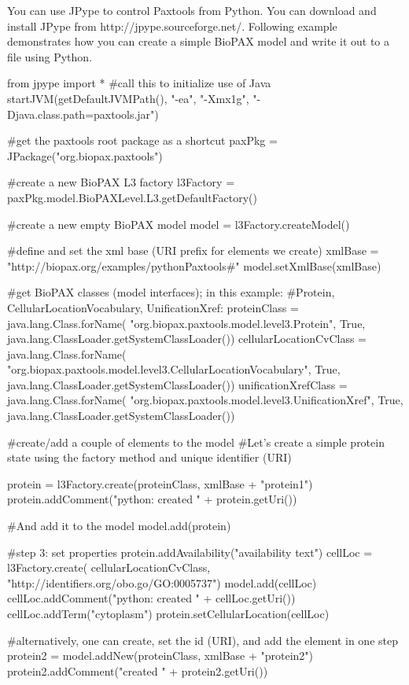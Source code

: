 \documentclass{tufte-book}
\begin{document}
You can use JPype to control Paxtools from Python. You can download and install JPype from http://jpype.sourceforge.net/. Following example demonstrates how you can create a simple BioPAX model and write it out to a file using Python. 
\begin{fullwidth}
\begin{pythoncode}
from jpype import *
#call this to initialize use of Java
startJVM(getDefaultJVMPath(), "-ea", "-Xmx1g", "-Djava.class.path=paxtools.jar")

#get the paxtools root package as a shortcut
paxPkg = JPackage("org.biopax.paxtools")

#create a new BioPAX L3 factory
l3Factory = paxPkg.model.BioPAXLevel.L3.getDefaultFactory()

#create a new empty BioPAX model
model = l3Factory.createModel()

#define and set the xml base (URI prefix for elements we create)
xmlBase = "http://biopax.org/examples/pythonPaxtools#"
model.setXmlBase(xmlBase)

#get BioPAX classes (model interfaces); in this example: 
#Protein, CellularLocationVocabulary, UnificationXref:
proteinClass = java.lang.Class.forName(
 "org.biopax.paxtools.model.level3.Protein", 
 True, java.lang.ClassLoader.getSystemClassLoader())
cellularLocationCvClass = java.lang.Class.forName(
 "org.biopax.paxtools.model.level3.CellularLocationVocabulary", 
 True, java.lang.ClassLoader.getSystemClassLoader())
unificationXrefClass = java.lang.Class.forName( 
 "org.biopax.paxtools.model.level3.UnificationXref",
 True, java.lang.ClassLoader.getSystemClassLoader())

#create/add a couple of elements to the model
#Let's create a simple protein state using the factory method and unique identifier (URI)

protein = l3Factory.create(proteinClass, xmlBase + "protein1")
protein.addComment("python: created " + protein.getUri())

#And add it to the model
model.add(protein)

#step 3: set properties
protein.addAvailability("availability text")
cellLoc = l3Factory.create(
 cellularLocationCvClass, "http://identifiers.org/obo.go/GO:0005737")
model.add(cellLoc)
cellLoc.addComment("python: created " + cellLoc.getUri())
cellLoc.addTerm("cytoplasm")
protein.setCellularLocation(cellLoc)

#alternatively, one can create, set the id (URI), and add the element in one step
protein2 = model.addNew(proteinClass, xmlBase + "protein2")
protein2.addComment("created " + protein2.getUri())
\end{pythoncode}



\end{fullwidth}
\end{document}
